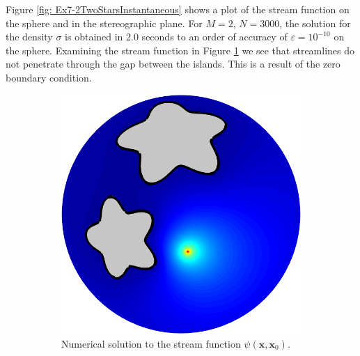 \documentclass{sfuthesis}
\begin{document}
Figure \ref{fig: Ex7-2TwoStarsInstantaneous} shows a plot of the stream function on the sphere and in the stereographic plane. For $M=2$, $N=3000$, the solution for the density $\sigma$ is obtained in 2.0 seconds  to an order of accuracy of $\varepsilon=10^{-10}$ on the sphere. Examining the stream function in Figure \ref{fig: Ex7-2TwoStarsStreamFn} we see that streamlines do not penetrate through the gap between the islands. This is a result of the zero boundary condition.
 
 \begin{figure}[h]
        \centering
        \begin{subfigure}[b]{0.4\textwidth}
       		\includegraphics[width=\textwidth]{Ex7-2TwoStarsStreamFn}
		\caption{Numerical solution to the stream function $\psi(\mathbf{x}, \mathbf{x}_0)$.}
		\label{fig: Ex7-2TwoStarsStreamFn}
     	\end{subfigure} \hspace{1cm}
      	\begin{subfigure}[b]{0.4\textwidth}

\end{subfigure}
\end{figure}
\end{document}

